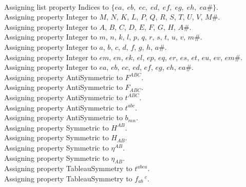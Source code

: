 \documentclass[11pt]{article}
\begin{document}
\\
Assigning list property Indices to $\{ea,\; eb,\; ec,\; ed,\; ef,\; eg,\; eh,\; ea\#\}$.
\\
Assigning property Integer to $M$, $N$, $K$, $L$, $P$, $Q$, $R$, $S$, $T$, $U$, $V$, $M\#$.
\\
Assigning property Integer to $A$, $B$, $C$, $D$, $E$, $F$, $G$, $H$, $A\#$.
\\
Assigning property Integer to $m$, $n$, $k$, $l$, $p$, $q$, $r$, $s$, $t$, $u$, $v$, $m\#$.
\\
Assigning property Integer to $a$, $b$, $c$, $d$, $f$, $g$, $h$, $a\#$.
\\
Assigning property Integer to $em$, $en$, $ek$, $el$, $ep$, $eq$, $er$, $es$, $et$, $eu$, $ev$, $em\#$.
\\
Assigning property Integer to $ea$, $eb$, $ec$, $ed$, $ef$, $eg$, $eh$, $ea\#$.
\\
Assigning property AntiSymmetric to ${F}^{A B C}$.
\\
Assigning property AntiSymmetric to ${F}_{A B C}$.
\\
Assigning property AntiSymmetric to ${t}^{A B C}$.
\\
Assigning property AntiSymmetric to ${t}^{a b c}$.
\\
Assigning property AntiSymmetric to ${b}_{m n}$.
\\
Assigning property Symmetric to ${H}^{A B}$.
\\
Assigning property Symmetric to ${H}_{A B}$.
\\
Assigning property Symmetric to ${\eta}^{A B}$.
\\
Assigning property Symmetric to ${\eta}_{A B}$.
\\
Assigning property TableauSymmetry to ${t}^{a b ea}$.
\\
Assigning property TableauSymmetry to ${f}_{a b}\,^{c}$.
\end{document}
